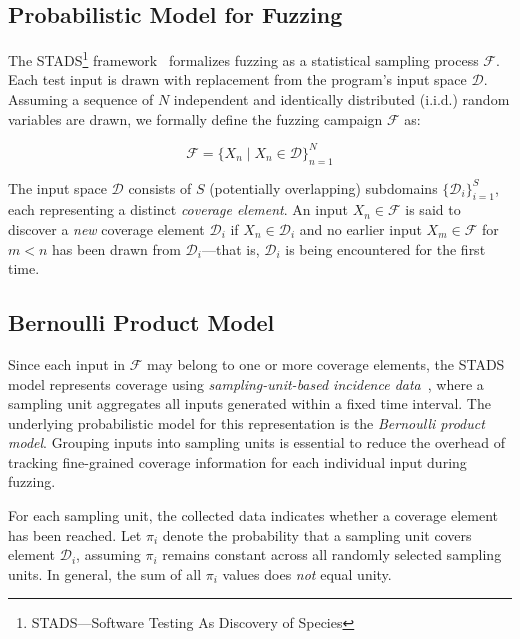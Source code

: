 \documentclass[conference]{IEEEtran}
\begin{document}
\subsection{Probabilistic Model for Fuzzing}

The STADS\footnote{STADS—Software Testing As Discovery of Species} framework~\cite{boehme2018stads,boehme2021residual,nguyen2022bedivfuzz,boehme2020boosting} formalizes
fuzzing as a statistical sampling process $\mathcal{F}$. Each test input is drawn with replacement from the program's input space $\pmb{\mathcal{D}}$. Assuming a sequence of $N$ independent and identically distributed (i.i.d.) random variables are drawn, we formally define the fuzzing campaign $\mathcal{F}$ as:

\begin{equation*}
    \mathcal{F}=\{X_n \mid X_n \in \pmb{\mathcal{D}}\}_{n=1}^N
\end{equation*}

The input space $\pmb{\mathcal{D}}$ consists of $S$ (potentially overlapping) subdomains $\{\mathcal{D}_i\}_{i=1}^S$, each representing a distinct \emph{coverage element}. An input $X_n \in \mathcal{F}$ is said to discover a \emph{new} coverage element $\mathcal{D}_i$ if $X_n \in \mathcal{D}_i$ and no earlier input $X_m \in \mathcal{F}$ for $m < n$ has been drawn from $\mathcal{D}_i$—that is, $\mathcal{D}_i$ is being encountered for the first time.


\subsection{Bernoulli Product Model}
Since each input in $\mathcal{F}$ may belong to one or more coverage elements, the STADS model represents coverage using \emph{sampling-unit-based incidence data}~\cite{colwell2012models,chao2017thirty}, where a sampling unit aggregates all inputs generated within a fixed time interval. The underlying probabilistic model for this representation is the \emph{Bernoulli product model}. Grouping inputs into sampling units is essential to reduce the overhead of tracking fine-grained coverage information for each individual input during fuzzing.


For each sampling unit, the collected data indicates whether a coverage element
has been reached. Let $\pi_i$ denote the probability that a sampling unit covers
element $\mathcal{D}_i$, assuming $\pi_i$ remains constant across all randomly
selected sampling units.
In general, the sum of all $\pi_i$ values does \emph{not} equal unity.
\end{document}

